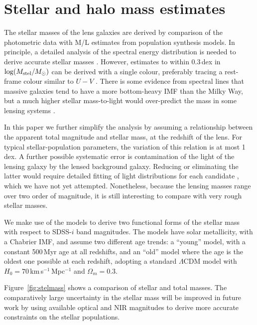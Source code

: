 \section{Stellar and halo mass estimates}\label{sec:stellar-mass}

The stellar masses of the lens galaxies are derived by comparison of
the photometric data with M/L estimates from population synthesis
models.  In principle, a detailed analysis of the spectral energy
distribution is needed to derive accurate stellar masses
\citep[e.g.][]{2009ApJS..185..253G,2011MNRAS.418.1587T}.  However,
estimates to within 0.3\,dex in $\log(M_\text{stel}/M_\odot)$ can be derived
with a single colour, preferably tracing a rest-frame colour similar
to $U-V$ \citep[see Fig.~1 of][]{2008MNRAS.383..857F}.  There is some
evidence from spectral lines that massive galaxies tend to have a more
bottom-heavy IMF than the Milky Way, but a much higher stellar
mass-to-light would over-predict the mass in some lensing systems
\citep{2015MNRAS.454L..71S}.

In this paper we further simplify the analysis by assuming a
relationship between the apparent total magnitude and stellar mass, at
the redshift of the lens.  For typical stellar-population parameters,
the variation of this relation is at most 1\,dex.  A further possible
systematic error is contamination of the light of the lensing galaxy
by the lensed background galaxy.  Reducing or eliminating the latter
would require detailed fitting of light distributions for each
candidate \citep[see][]{2011ApJ...740...97L}, which we have not yet
attempted.  Nonetheless, because the lensing masses range over two
order of magnitude, it is still interesting to compare with very rough
stellar masses.

We make use of the \citet{2003MNRAS.344.1000B} models to derive two
functional forms of the stellar mass with respect to SDSS-$i$ band
magnitudes. The models have solar metallicity, with a Chabrier IMF,
and assume two different age trends: a ``young'' model, with a
constant 500\,Myr age at all redshifts, and an ``old'' model where the
age is the oldest one possible at each redshift, adopting a standard
$\Lambda$CDM model with $H_0=70$\,km\,s$^{-1}$\,Mpc$^{-1}$ and
$\Omega_m=0.3$.

Figure~\ref{fig:stelmass} shows a comparison of stellar and total
masses.  The comparatively large uncertainty in the stellar mass will
be improved in future work by using available optical and NIR
magnitudes to derive more accurate constraints on the stellar
populations.


